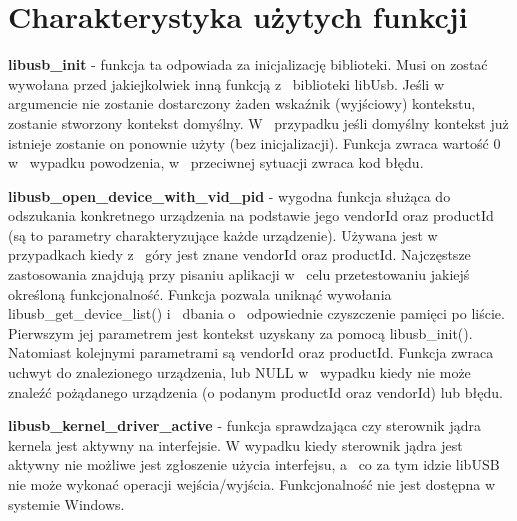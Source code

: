 \documentclass{BscUS}
\begin{document}
\section{Charakterystyka użytych funkcji}
\begin{itemize}
{
\item \textbf{libusb\_init} - funkcja ta odpowiada za inicjalizację biblioteki.
Musi on zostać wywołana przed jakiejkolwiek inną funkcją z~ biblioteki libUsb.
Jeśli w~ argumencie nie zostanie dostarczony żaden wskaźnik (wyjściowy) kontekstu, zostanie stworzony kontekst domyślny. W~ przypadku jeśli domyślny kontekst już istnieje zostanie on ponownie użyty (bez inicjalizacji).
Funkcja zwraca wartość 0 w~ wypadku powodzenia, w~ przeciwnej sytuacji zwraca kod błędu.
\item \textbf{libusb\_open\_device\_with\_vid\_pid} - wygodna funkcja służąca do odszukania konkretnego urządzenia na podstawie jego vendorId oraz productId (są to parametry charakteryzujące każde urządzenie).
Używana jest w~ przypadkach kiedy z~ góry jest znane vendorId oraz productId. Najczęstsze zastosowania znajdują przy pisaniu aplikacji w~ celu przetestowaniu jakiejś określoną funkcjonalność. Funkcja pozwala uniknąć wywołania libusb\_get\_device\_list() i~ dbania o~ odpowiednie czyszczenie pamięci po liście.
Pierwszym jej parametrem jest kontekst uzyskany za pomocą libusb\_init().
Natomiast kolejnymi parametrami są vendorId oraz productId.
Funkcja zwraca uchwyt do znalezionego urządzenia, lub NULL w~ wypadku kiedy nie może znaleźć pożądanego urządzenia (o podanym productId oraz vendorId) lub błędu.
\item \textbf{libusb\_kernel\_driver\_active} - funkcja sprawdzająca czy sterownik jądra kernela jest aktywny na interfejsie.
W wypadku kiedy sterownik jądra jest aktywny nie możliwe jest zgłoszenie użycia interfejsu, a~ co za tym idzie libUSB nie może wykonać operacji wejścia/wyjścia.
Funkcjonalność nie jest dostępna w~ systemie Windows.
}
\end{itemize}
\end{document}
